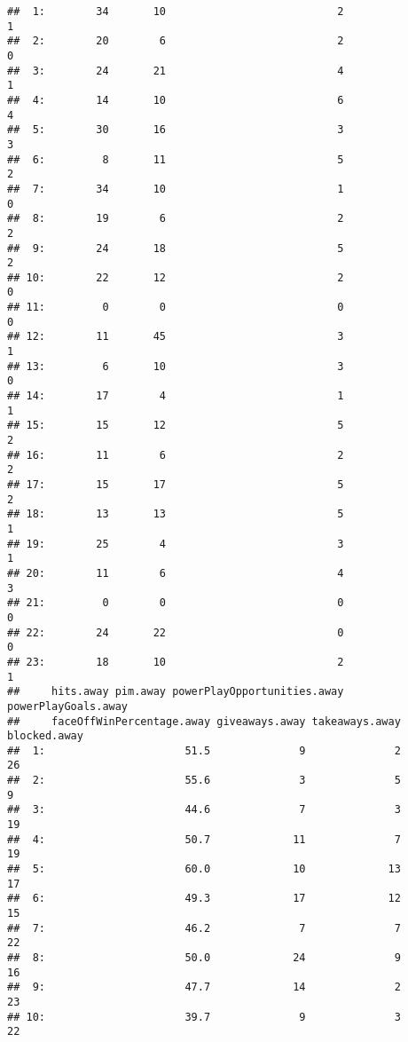 \documentclass[
]{article}
\begin{document}
\begin{verbatim}
##  1:        34       10                           2                   1
##  2:        20        6                           2                   0
##  3:        24       21                           4                   1
##  4:        14       10                           6                   4
##  5:        30       16                           3                   3
##  6:         8       11                           5                   2
##  7:        34       10                           1                   0
##  8:        19        6                           2                   2
##  9:        24       18                           5                   2
## 10:        22       12                           2                   0
## 11:         0        0                           0                   0
## 12:        11       45                           3                   1
## 13:         6       10                           3                   0
## 14:        17        4                           1                   1
## 15:        15       12                           5                   2
## 16:        11        6                           2                   2
## 17:        15       17                           5                   2
## 18:        13       13                           5                   1
## 19:        25        4                           3                   1
## 20:        11        6                           4                   3
## 21:         0        0                           0                   0
## 22:        24       22                           0                   0
## 23:        18       10                           2                   1
##     hits.away pim.away powerPlayOpportunities.away powerPlayGoals.away
##     faceOffWinPercentage.away giveaways.away takeaways.away blocked.away
##  1:                      51.5              9              2           26
##  2:                      55.6              3              5            9
##  3:                      44.6              7              3           19
##  4:                      50.7             11              7           19
##  5:                      60.0             10             13           17
##  6:                      49.3             17             12           15
##  7:                      46.2              7              7           22
##  8:                      50.0             24              9           16
##  9:                      47.7             14              2           23
## 10:                      39.7              9              3           22

\end{verbatim}
\end{document}
